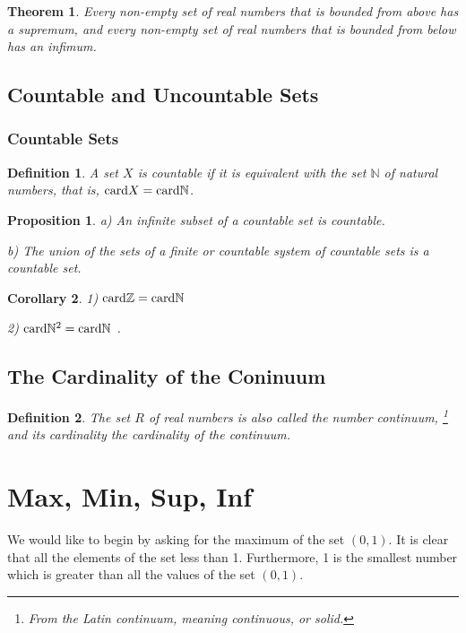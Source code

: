 \documentclass[a4paper,12pt]{article} %
\newtheorem{definition}{Definition}[section]
\newtheorem{theorem}{Theorem}[section]
\newtheorem{proposition}{Proposition}[section]
\newtheorem{corollary}[theorem]{Corollary}
\begin{document}
\begin{theorem}
    Every non-empty set of real numbers that is bounded from
    above has a supremum, and every non-empty set of real 
    numbers that is bounded from below has an infimum.
\end{theorem}
\subsection{Countable and Uncountable Sets}
\subsubsection{Countable Sets}
\begin{definition}
    A set $X$ is countable if it is equivalent with the set $\mathbb{N}$ 
    of natural numbers, that is, ${\rm card} X = {\rm card}\mathbb{N} $.
\end{definition}

\begin{proposition}
    a) An infinite subset of a countable set is countable.

    b) The union of the sets of a finite or countable system of countable 
    sets is a countable set.
\end{proposition}

\begin{corollary}
    1) ${\rm card} \mathbb{Z} = {\rm card} \mathbb{N}$
    
    2) ${\rm card} \mathbb{N}^2 = {\rm card} \mathbb{N}$ .
\end{corollary}

\subsection{The Cardinality of the Coninuum}
\begin{definition}
    The set $R$ of real numbers is also called the number continuum, 
    \footnote{From the Latin continuum, meaning continuous, or solid.}
    and its cardinality the cardinality of the continuum.
\end{definition}

\section{Max, Min, Sup, Inf}
We would like to begin by asking for the maximum of the set $(0,1)$.
It is clear that all the elements of the set less than 1. Furthermore, 
1 is the smallest number which is greater than all the values of the set 
$(0,1)$. 
\end{document}

